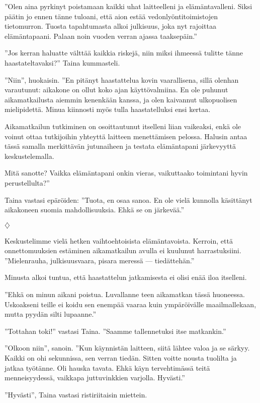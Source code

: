 ﻿\documentclass[a4paper, 12pt, finnish]{article}
\newcommand{\q}[1]{''#1''}
\def\jump{\vspace{2mm} \centerline{$\diamondsuit$} \vspace{2mm}}
\begin{document}
\q{Olen aina pyrkinyt poistamaan kaikki uhat laitteelleni
ja elämäntavalleni. Siksi päätin jo ennen tänne tuloani, että
aion estää vedonlyöntitoimistojen tietomurron. Tuosta
tapahtumasta alkoi julkisuus, joka nyt rajoittaa elämäntapaani.
Palaan noin vuoden verran ajassa taaksepäin.}

\q{Jos kerran haluatte välttää kaikkia riskejä, niin miksi
ihmeessä tulitte tänne haastateltavaksi?} Taina kummasteli.

\q{Niin}, huokaisin. \q{En pitänyt haastattelua kovin vaarallisena,
sillä olenhan varautunut: aikakone on ollut koko ajan käyttövalmiina.
En ole puhunut aikamatkailusta aiemmin 
kenenkään kanssa, ja olen kaivannut ulkopuolisen mielipidettä.
Minua kiinnosti myös tulla haastatelluksi ensi kertaa.

Aikamatkailun tutkiminen on osoittautunut itselleni
liian vaikeaksi, enkä ole voinut ottaa tutkijoihin
yhteyttä laitteen menettämisen pelossa.
Halusin antaa tässä samalla merkittävän jutunaiheen ja
testata elämäntapani järkevyyttä keskustelemalla.

Mitä sanotte? Vaikka elämäntapani onkin vieras,
vaikuttaako toimintani hyvin perustellulta?}

Taina vastasi epäröiden: \q{Tuota, en osaa sanoa.
En ole vielä kunnolla käsittänyt aikakoneen suomia
mahdollisuuksia. Ehkä se on järkevää.}
 

\jump


Keskustelimme vielä hetken vaihtoehtoisista elämäntavoista.
Kerroin, että onnettomuuksien estäminen aikamatkailun
avulla ei kuulunut harrastuksiini. \q{Mielenrauha, julkisuusvaara,
pisara meressä --- tiedättehän.}

Minusta alkoi tuntua, että haastattelun jatkamisesta ei olisi
enää iloa itselleni.

\q{Ehkä on minun aikani poistua. Luvallanne teen aikamatkan tässä
huoneessa. Uskoakseni teille ei koidu sen enempää vaaraa kuin
ympäröivälle maailmallekaan, mutta pyydän silti lupaanne.}

\q{Tottahan toki!} vastasi Taina. \q{Saamme tallennetuksi itse matkankin.}

\q{Olkoon niin}, sanoin. \q{Kun käynnistän laitteen, siitä lähtee
valoa ja se särkyy. Kaikki on ohi sekunnissa, sen verran tiedän.
Sitten voitte nousta tuolilta ja jatkaa työtänne.
Oli hauska tavata. Ehkä käyn tervehtimässä teitä menneisyydessä,
vaikkapa juttuvinkkien varjolla. Hyvästi.}

\q{Hyvästi}, Taina vastasi ristiriitaisin miettein.
\end{document}
